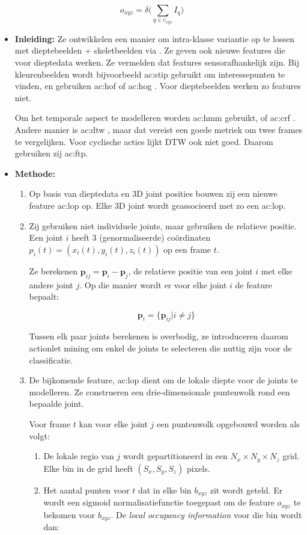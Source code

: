 $$o_{xyz} = \delta\bigg(\sum_{q \in c_{xyz}} I_q \bigg)$$


\begin{itemize}
	\item \textbf{Inleiding:} Ze ontwikkelen een manier om intra-klasse variantie op te lossen met dieptebeelden + skeletbeelden via \cite{Shotton2011}. Ze geven ook nieuwe features die voor dieptedata werken. Ze vermelden dat features sensorafhankelijk zijn. Bij kleurenbeelden wordt bijvoorbeeld \gls{ac:stip} \cite{Laptev2003} gebruikt om interessepunten te vinden, en gebruiken \gls{ac:hof} \cite{Laptev2010} of \gls{ac:hog} \cite{Dalal2010}. Voor dieptebeelden werken zo features niet. 
	
	Om het temporale aspect te modelleren worden \gls{ac:hmm} \cite{Lv2006} gebruikt, of \gls{ac:crf} \cite{Han2010}. Andere manier is \gls{ac:dtw} \cite{Muller2006}, maar dat vereist een goede metriek om twee frames te vergelijken. Voor cyclische acties lijkt DTW ook niet goed. Daarom gebruiken zij \gls{ac:ftp}.
	\item \textbf{Methode:}
	\begin{enumerate}
		\item Op basis van dieptedata en 3D joint posities bouwen zij een nieuwe feature \gls{ac:lop} op. Elke 3D joint wordt geassocieerd met zo een \gls{ac:lop}.
		\item Zij gebruiken niet individuele joints, maar gebruiken de relatieve positie. Een joint $i$ heeft 3 (genormaliseerde) coördinaten $p_i(t) = (x_i(t), y_i(t), z_i(t))$ op een frame $t$.
		
		Ze berekenen $\textbf{p}_{ij} = \textbf{p}_i - \textbf{p}_j$, de relatieve positie van een joint $i$ met elke andere joint $j$. Op die manier wordt er voor elke joint $i$ de feature bepaalt:
		
		$$\textbf{p}_i = \{\textbf{p}_{ij} | i \neq j \}$$
		
		Tussen elk paar joints berekenen is overbodig, ze introduceren daarom actionlet mining om enkel de joints te selecteren die nuttig zijn voor de classificatie.
		
		\item De bijkomende feature, \gls{ac:lop} dient om de lokale diepte voor de joints te modelleren. Ze construeren een drie-dimensionale puntenwolk rond een bepaalde joint.
		
		Voor frame $t$ kan voor elke joint $j$ een puntenwolk opgebouwd worden als volgt:
		
		\begin{enumerate}
			\item De lokale regio van $j$ wordt gepartitioneerd in een $N_x \times N_y \times N_z$ grid. Elke bin in de grid heeft  $(S_x, S_y, S_z)$ pixels.
			\item Het aantal punten voor $t$ dat in elke bin $b_{xyz}$ zit wordt geteld. Er wordt een sigmoid normalisatiefunctie toegepast om de feature $o_{xyz}$ te bekomen voor $b_{xyz}$. De \textit{local occupancy information} voor die bin wordt dan:
			

\end{enumerate}
\end{enumerate}
\end{itemize}
